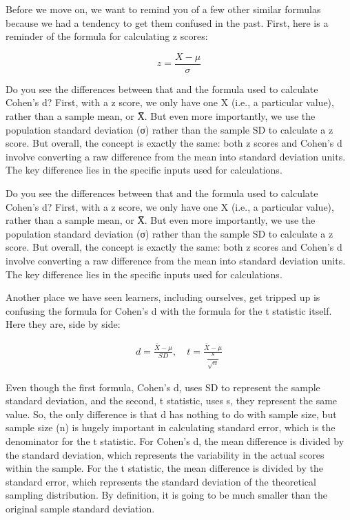 \documentclass[
  letterpaper,
  DIV=11,
  numbers=noendperiod]{scrreprt}
\begin{document}
Before we move on, we want to remind you of a few other similar formulas
because we had a tendency to get them confused in the past. First, here
is a reminder of the formula for calculating z scores:

\[
z = \frac{X - \mu}{\sigma}
\]

Do you see the differences between that and the formula used to
calculate Cohen's d? First, with a z score, we only have one X (i.e., a
particular value), rather than a sample mean, or X̅. But even more
importantly, we use the population standard deviation (σ) rather than
the sample SD to calculate a z score. But overall, the concept is
exactly the same: both z scores and Cohen's d involve converting a raw
difference from the mean into standard deviation units. The key
difference lies in the specific inputs used for calculations.

Do you see the differences between that and the formula used to
calculate Cohen's d? First, with a z score, we only have one X (i.e., a
particular value), rather than a sample mean, or X̅. But even more
importantly, we use the population standard deviation (σ) rather than
the sample SD to calculate a z score. But overall, the concept is
exactly the same: both z scores and Cohen's d involve converting a raw
difference from the mean into standard deviation units. The key
difference lies in the specific inputs used for calculations.

Another place we have seen learners, including ourselves, get tripped up
is confusing the formula for Cohen's d with the formula for the t
statistic itself. Here they are, side by side:

\[
\begin{aligned}
d = \frac{\bar{X}-\mu}{SD}, \quad
t = \frac{\bar{X}-\mu}{\dfrac{s}{\sqrt{n}}}
\end{aligned}
\]

Even though the first formula, Cohen's d, uses SD to represent the
sample standard deviation, and the second, t statistic, uses s, they
represent the same value. So, the only difference is that d has nothing
to do with sample size, but sample size (n) is hugely important in
calculating standard error, which is the denominator for the t
statistic. For Cohen's d, the mean difference is divided by the standard
deviation, which represents the variability in the actual scores within
the sample. For the t statistic, the mean difference is divided by the
standard error, which represents the standard deviation of the
theoretical sampling distribution. By definition, it is going to be much
smaller than the original sample standard deviation.
\end{document}
